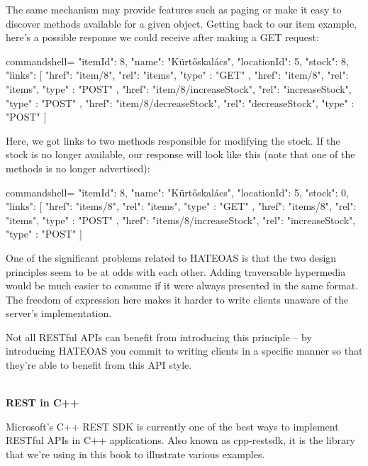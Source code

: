 The same mechanism may provide features such as paging or make it easy to discover methods available for a given object. Getting back to our item example, here's a possible response we could receive after making a GET request:

\begin{tcblisting}{commandshell={}}
{
  "itemId": 8,
  "name": "Kürtőskalács",
  "locationId": 5,
  "stock": 8,
  "links": [
    {
      "href": "item/8",
      "rel": "items",
      "type" : "GET"
    },
    {
      "href": "item/8",
      "rel": "items",
      "type" : "POST"
    },
    {
      "href": "item/8/increaseStock",
      "rel": "increaseStock",
      "type" : "POST"
    },
    {
      "href": "item/8/decreaseStock",
      "rel": "decreaseStock",
      "type" : "POST"
    }
  ]
}
\end{tcblisting}

Here, we got links to two methods responsible for modifying the stock. If the stock is no longer available, our response will look like this (note that one of the methods is no longer advertised):

\begin{tcblisting}{commandshell={}}
{
  "itemId": 8,
  "name": "Kürtőskalács",
  "locationId": 5,
  "stock": 0,
  "links": [
    {
      "href": "items/8",
      "rel": "items",
      "type" : "GET"
    },
    {
      "href": "items/8",
      "rel": "items",
      "type" : "POST"
    },
    {
      "href": "items/8/increaseStock",
      "rel": "increaseStock",
      "type" : "POST"
    }
  ]
}
\end{tcblisting}

One of the significant problems related to HATEOAS is that the two design principles seem to be at odds with each other. Adding traversable hypermedia would be much easier to consume if it were always presented in the same format. The freedom of expression here makes it harder to write clients unaware of the server's implementation.

Not all RESTful APIs can benefit from introducing this principle – by introducing HATEOAS you commit to writing clients in a specific manner so that they're able to benefit from this API style.

\hspace*{\fill} \\ %
\noindent
\textbf{REST in C++}

Microsoft's C++ REST SDK is currently one of the best ways to implement RESTful APIs in C++ applications. Also known as cpp-restsdk, it is the library that we're using in this book to illustrate various examples.

